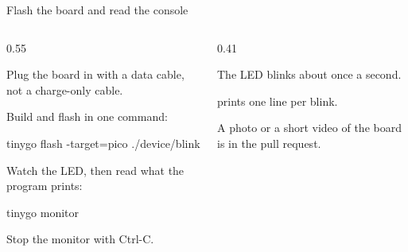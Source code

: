 \documentclass[10pt,aspectratio=169,t]{beamer}
\begin{document}
\begin{frame}[fragile,embedded,eyebrow=Task II]{Flash the board and read the console}
  \begin{columns}[T]
    \begin{column}{0.55\textwidth}
      \begin{steps}
        \item Plug the board in with a data cable, not a charge-only cable.
        \item Build and flash in one command:
\begin{shell}
tinygo flash -target=pico ./device/blink
\end{shell}
        \item Watch the LED, then read what the program prints:
\begin{shell}
tinygo monitor
\end{shell}
        \item Stop the monitor with Ctrl-C.
      \end{steps}
    \end{column}
    \begin{column}{0.41\textwidth}
      \begin{checklist}
        \item The LED blinks about once a second.
        \item {} prints one line per blink.
        \item A photo or a short video of the board is in the pull request.
      \end{checklist}
    \end{column}
  \end{columns}
\end{frame}
\end{document}
